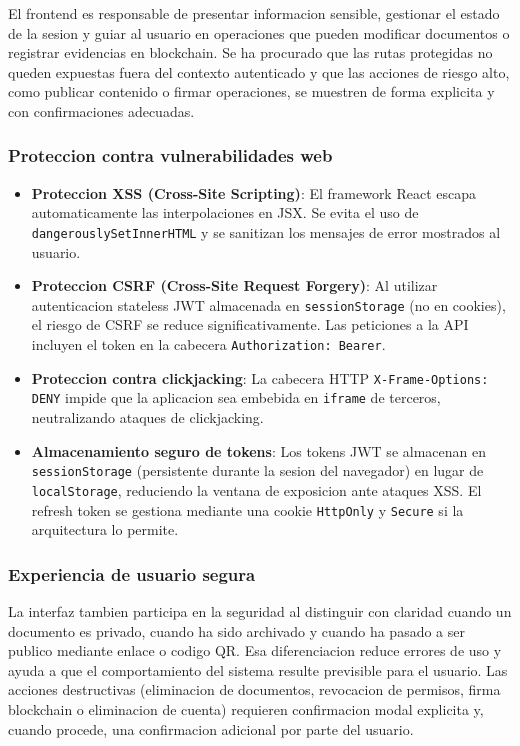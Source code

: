 \documentclass[11pt, a4paper]{article}
\begin{document}
El frontend es responsable de presentar informacion sensible, gestionar el estado de la sesion y guiar al usuario en operaciones que pueden modificar documentos o registrar evidencias en blockchain. Se ha procurado que las rutas protegidas no queden expuestas fuera del contexto autenticado y que las acciones de riesgo alto, como publicar contenido o firmar operaciones, se muestren de forma explicita y con confirmaciones adecuadas.

\subsubsection{Proteccion contra vulnerabilidades web}

\begin{itemize}
    \item \textbf{Proteccion XSS (Cross-Site Scripting)}: El framework React escapa automaticamente las interpolaciones en JSX. Se evita el uso de \texttt{dangerouslySetInnerHTML} y se sanitizan los mensajes de error mostrados al usuario.
    \item \textbf{Proteccion CSRF (Cross-Site Request Forgery)}: Al utilizar autenticacion stateless JWT almacenada en \texttt{sessionStorage} (no en cookies), el riesgo de CSRF se reduce significativamente. Las peticiones a la API incluyen el token en la cabecera \texttt{Authorization: Bearer}.
    \item \textbf{Proteccion contra clickjacking}: La cabecera HTTP \texttt{X-Frame-Options: DENY} impide que la aplicacion sea embebida en \texttt{iframe} de terceros, neutralizando ataques de clickjacking.
    \item \textbf{Almacenamiento seguro de tokens}: Los tokens JWT se almacenan en \texttt{sessionStorage} (persistente durante la sesion del navegador) en lugar de \texttt{localStorage}, reduciendo la ventana de exposicion ante ataques XSS. El refresh token se gestiona mediante una cookie \texttt{HttpOnly} y \texttt{Secure} si la arquitectura lo permite.
\end{itemize}

\subsubsection{Experiencia de usuario segura}

La interfaz tambien participa en la seguridad al distinguir con claridad cuando un documento es privado, cuando ha sido archivado y cuando ha pasado a ser publico mediante enlace o codigo QR. Esa diferenciacion reduce errores de uso y ayuda a que el comportamiento del sistema resulte previsible para el usuario. Las acciones destructivas (eliminacion de documentos, revocacion de permisos, firma blockchain o eliminacion de cuenta) requieren confirmacion modal explicita y, cuando procede, una confirmacion adicional por parte del usuario.
\end{document}
